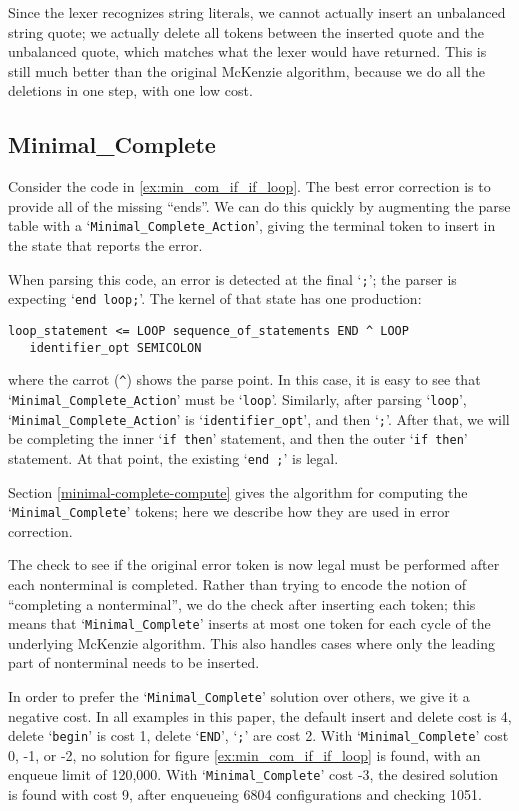 \documentclass{article}
\newcommand{\code}[1]{`{\tt #1}'}
\begin{document}
Since the lexer recognizes string literals, we cannot actually insert
an unbalanced string quote; we actually delete all tokens between the
inserted quote and the unbalanced quote, which matches what the lexer
would have returned. This is still much better than the original
McKenzie algorithm, because we do all the deletions in one step, with
one low cost.

\subsection{Minimal\_Complete}
Consider the code in \ref{ex:min_com_if_if_loop}. The best error
correction is to provide all of the missing ``ends''. We can do this
quickly by augmenting the parse table with a
\code{Minimal\_Complete\_Action}, giving the terminal token to insert in
the state that reports the error.

When parsing this code, an error is detected at the final \code{;};
the parser is expecting \code{end loop;}. The kernel of that state has
one production:
\begin{verbatim}
loop_statement <= LOOP sequence_of_statements END ^ LOOP
   identifier_opt SEMICOLON
\end{verbatim}
where the carrot (\verb|^|) shows the parse point. In this
case, it is easy to see that \code{Minimal\_Complete\_Action} must be
\code{loop}. Similarly, after parsing \code{loop}, \code{Minimal\_Complete\_Action}
is \code{identifier\_opt}, and then \code{;}. After that,
we will be completing the inner \code{if then} statement, and then the
outer \code{if then} statement. At that point, the existing
\code{end ;} is legal.

Section \ref{minimal-complete-compute} gives the algorithm for
computing the \code{Minimal\_Complete} tokens; here we describe how
they are used in error correction.

The check to see if the original error token is now legal must be
performed after each nonterminal is completed. Rather than trying to
encode the notion of ``completing a nonterminal'', we do the check
after inserting each token; this means that \code{Minimal\_Complete}
inserts at most one token for each cycle of the underlying McKenzie
algorithm. This also handles cases where only the leading part of
nonterminal needs to be inserted.

In order to prefer the \code{Minimal\_Complete} solution over others,
we give it a negative cost. In all examples in this paper, the default
insert and delete cost is 4, delete \code{begin} is cost 1, delete
\code{END}, \code{;} are cost 2. With \code{Minimal\_Complete} cost 0,
-1, or -2, no solution for figure \ref{ex:min_com_if_if_loop} is
found, with an enqueue limit of 120,000. With \code{Minimal\_Complete}
cost -3, the desired solution is found with cost 9, after enqueueing
6804 configurations and checking 1051.
\end{document}
